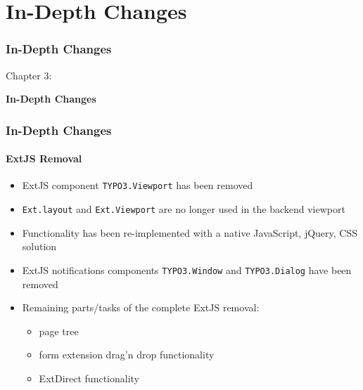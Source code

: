 %

\section{In-Depth Changes}
\begin{frame}[fragile]
	\frametitle{In-Depth Changes}

	\begin{center}\huge{Chapter 3:}\end{center}
	\begin{center}\huge{\color{typo3darkgrey}\textbf{In-Depth Changes}}\end{center}

\end{frame}


\begin{frame}[fragile]
	\frametitle{In-Depth Changes}
	\framesubtitle{ExtJS Removal}

	\begin{itemize}
		\item ExtJS component \texttt{TYPO3.Viewport} has been removed
		\item \texttt{Ext.layout} and \texttt{Ext.Viewport} are no longer used in the backend viewport
		\item Functionality has been re-implemented with a native JavaScript, jQuery, CSS solution
		\item ExtJS notifications components \texttt{TYPO3.Window} and \texttt{TYPO3.Dialog} have been removed
		\item Remaining parts/tasks of the complete ExtJS removal:

		\begin{itemize}
			\item page tree
			\item form extension drag'n drop functionality
			\item ExtDirect functionality
		\end{itemize}

	\end{itemize}

\end{frame}

